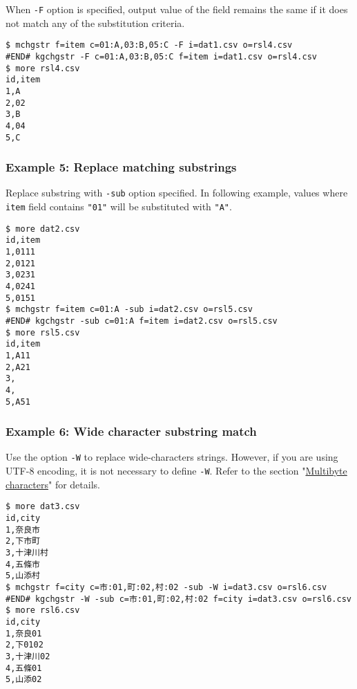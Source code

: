 When \verb|-F| option is specified, output value of the field remains the same if it does not match any of the substitution criteria.


\begin{Verbatim}[baselinestretch=0.7,frame=single]
$ mchgstr f=item c=01:A,03:B,05:C -F i=dat1.csv o=rsl4.csv
#END# kgchgstr -F c=01:A,03:B,05:C f=item i=dat1.csv o=rsl4.csv
$ more rsl4.csv
id,item
1,A
2,02
3,B
4,04
5,C
\end{Verbatim}
\subsubsection*{Example 5: Replace matching substrings}

Replace substring with \verb|-sub| option specified. In following example, values where \verb|item| field contains \verb|"01"| will be substituted with \verb|"A"|.


\begin{Verbatim}[baselinestretch=0.7,frame=single]
$ more dat2.csv
id,item
1,0111
2,0121
3,0231
4,0241
5,0151
$ mchgstr f=item c=01:A -sub i=dat2.csv o=rsl5.csv
#END# kgchgstr -sub c=01:A f=item i=dat2.csv o=rsl5.csv
$ more rsl5.csv
id,item
1,A11
2,A21
3,
4,
5,A51
\end{Verbatim}
\subsubsection*{Example 6: Wide character substring match}

Use the option \verb|-W| to replace wide-characters strings. However, if you are using UTF-8 encoding, it is not necessary to define \verb|-W|. Refer to the section "\hyperref[sect:multibyte]{Multibyte characters}" for details.


\begin{Verbatim}[baselinestretch=0.7,frame=single]
$ more dat3.csv
id,city
1,奈良市
2,下市町
3,十津川村
4,五條市
5,山添村
$ mchgstr f=city c=市:01,町:02,村:02 -sub -W i=dat3.csv o=rsl6.csv
#END# kgchgstr -W -sub c=市:01,町:02,村:02 f=city i=dat3.csv o=rsl6.csv
$ more rsl6.csv
id,city
1,奈良01
2,下0102
3,十津川02
4,五條01
5,山添02
\end{Verbatim}
